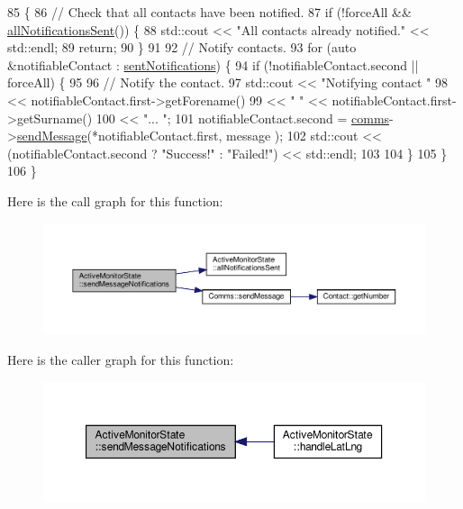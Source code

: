 \begin{DoxyCode}
85 \{
86     \textcolor{comment}{// Check that all contacts have been notified.}
87     \textcolor{keywordflow}{if} (!forceAll && \hyperlink{class_active_monitor_state_add557ab0dd0774482c08c982b82395e7}{allNotificationsSent}()) \{
88         std::cout << \textcolor{stringliteral}{"All contacts already notified."} << std::endl;
89         \textcolor{keywordflow}{return};
90     \}
91 
92     \textcolor{comment}{// Notify contacts.}
93     \textcolor{keywordflow}{for} (\textcolor{keyword}{auto} &notifiableContact : \hyperlink{class_active_monitor_state_a25493a87079926faf7d03b8587ad9f62}{sentNotifications}) \{
94         \textcolor{keywordflow}{if} (!notifiableContact.second || forceAll) \{
95 
96             \textcolor{comment}{// Notify the contact.}
97             std::cout << \textcolor{stringliteral}{"Notifying contact "}
98                       << notifiableContact.first->getForename()
99                       << \textcolor{stringliteral}{" "} << notifiableContact.first->getSurname()
100                       << \textcolor{stringliteral}{"... "};
101             notifiableContact.second = \hyperlink{class_monitor_state_a41914e9963c67ef2d17774f04bad3518}{comms}->\hyperlink{class_comms_a30ab10ea604ab2b169ca66f3f1071c0e}{sendMessage}(*notifiableContact.first, message
      );
102             std::cout << (notifiableContact.second ? \textcolor{stringliteral}{"Success!"} : \textcolor{stringliteral}{"Failed!"}) << std::endl;
103 
104         \}
105     \}
106 \}
\end{DoxyCode}
Here is the call graph for this function\+:\nopagebreak
\begin{figure}[H]
\begin{center}
\leavevmode
\includegraphics[width=350pt]{d9/db8/class_active_monitor_state_aae5b3a425c74e7017446be277d69c06d_cgraph}
\end{center}
\end{figure}
Here is the caller graph for this function\+:\nopagebreak
\begin{figure}[H]
\begin{center}
\leavevmode
\includegraphics[width=350pt]{d9/db8/class_active_monitor_state_aae5b3a425c74e7017446be277d69c06d_icgraph}
\end{center}
\end{figure}
